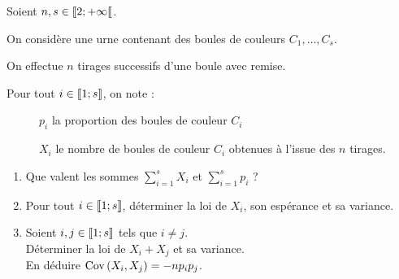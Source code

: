 \begin{exo}[Exercice 9]
Soient \(n,s\in\left\llbracket2;+\infty\right\llbracket\).

On considère une urne contenant des boules de couleurs \(C_1,\dots,C_s\).

On effectue \(n\) tirages successifs d'une boule avec remise.

Pour tout \(i\in\left\llbracket1;s\right\rrbracket\), on note : \begin{description}
    \item[] \(p_i\) la proportion des boules de couleur \(C_i\)
    \item[] \(X_i\) le nombre de boules de couleur \(C_i\) obtenues à l'issue des \(n\) tirages.
\end{description}

\begin{enumerate}
    \item Que valent les sommes \(\sum_{i=1}^sX_i\) et \(\sum_{i=1}^sp_i\) ? \\
    \item Pour tout \(i\in\left\llbracket1;s\right\rrbracket\), déterminer la loi de \(X_i\), son espérance et sa variance. \\
    \item Soient \(i,j\in\left\llbracket1;s\right\rrbracket\) tels que \(i\not=j\). \\ Déterminer la loi de \(X_i+X_j\) et sa variance. \\ En déduire \(\operatorname{Cov}\left(X_i,X_j\right)=-np_ip_j\).
\end{enumerate}
\end{exo}

\begin{corr}
\end{corr}

